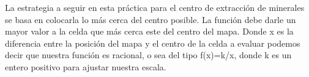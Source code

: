 La estrategia a seguir en esta práctica para el centro de extracción de minerales se basa en colocarla lo más cerca del centro posible. La función debe darle un mayor valor a la celda que más cerca este del centro del mapa. Donde x es la diferencia entre la posición del mapa y el centro de la celda a evaluar podemos decir que nuestra función es racional, o sea del tipo f(x)=k/x, donde k es un entero positivo para ajustar nuestra escala.
\vspace{5mm}
